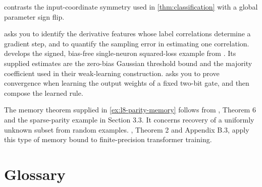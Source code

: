 \documentclass[11pt,twoside]{article}
\theoremstyle{definition}
\theoremstyle{remark}
\begin{document}
 contrasts the input-coordinate symmetry
used in \cref{thm:classification} with a global parameter sign flip.

 asks you to identify the derivative features
whose label correlations determine a gradient step, and to quantify the
sampling error in estimating one correlation.
 develops the signed, bias-free single-neuron
squared-loss example from \citet{shoshani2025}. Its supplied estimates are
the zero-bias Gaussian threshold bound and the majority coefficient used in
their weak-learning construction.
 asks you to prove convergence when learning the
output weights of a fixed two-bit gate, and then compose the learned rule.

The memory theorem supplied in \cref{ex:l8-parity-memory} follows from
\citet{lyu2023}, Theorem 6 and the sparse-parity example in Section 3.3.
It concerns recovery of a uniformly unknown subset from random examples.
\citet{wen2025}, Theorem 2 and Appendix B.3, apply this type of memory
bound to finite-precision transformer training.

\section*{Glossary}
\end{document}
